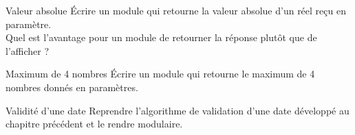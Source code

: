 \begin{Exercice}{Valeur absolue}
Écrire un module qui retourne la valeur absolue d'un
réel reçu en paramètre.
\\Quel est l'avantage pour un module de retourner la réponse 
plutôt que de l'afficher ?
\end{Exercice}

\begin{Exercice}{Maximum de 4 nombres}
Écrire un module qui retourne le maximum de 4
nombres donnés en paramètres.
\end{Exercice}

\begin{Exercice}{Validité d'une date}
Reprendre l'algorithme de validation d'une date 
développé au chapitre précédent et le rendre modulaire.
\end{Exercice}

